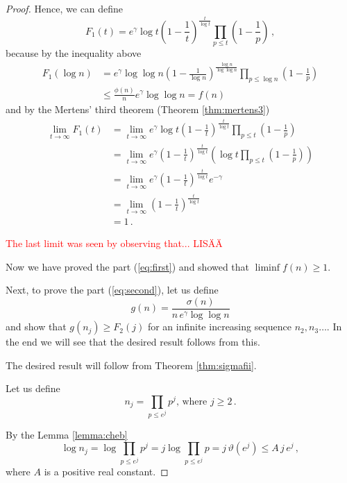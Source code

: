\documentclass{article}
\begin{document}
\begin{theorem}
\begin{proof}
Hence, we can define
\begin{equation*}
    F_1(t)=e^\gamma \log t \left(1-\frac{1}{t}\right)^\frac{t}{\log t} \prod_{p\leq t} \left(1-\frac{1}{p}\right)\,,
\end{equation*}
because by the inequality above
\begin{align*}
    F_1(\log n) & = e^\gamma \log \log n \left(1-\frac{1}{\log n}\right)^\frac{\log n}{\log \log n} \prod_{p\leq \log n} \left(1-\frac{1}{p}\right)\\
    & \leq \frac{\phi(n)}{n} e^\gamma \log\log n = f(n)
\end{align*}
and by the Mertens' third theorem (Theorem \ref{thm:mertens3})
\begin{align*}
    \lim_{t \rightarrow \infty} F_1(t) & = \lim_{t \rightarrow \infty} e^\gamma \log t \left(1-\frac{1}{t}\right)^\frac{t}{\log t} \prod_{p\leq t} \left(1-\frac{1}{p}\right)\\
    & = \lim_{t \rightarrow \infty} e^\gamma \left( 1-\frac{1}{t}\right)^\frac{t}{\log t} \left(\log t \prod_{p\leq t} \left(1-\frac{1}{p}\right) \right)\\
    & = \lim_{t \rightarrow \infty} e^\gamma \left( 1-\frac{1}{t}\right)^\frac{t}{\log t} e^{-\gamma}\\
    & = \lim_{t \rightarrow \infty} \left( 1-\frac{1}{t}\right)^\frac{t}{\log t}\\
    & = 1\,.
\end{align*}

\textcolor{red}{The last limit was seen by observing that... LISÄÄ}

Now we have proved the part (\ref{eq:first}) and showed that
$\liminf{f(n)}\geq 1$.

Next, to prove the part (\ref{eq:second}), let us define
\begin{equation*}
    g(n)=\frac{\sigma(n)}{n\,e^\gamma \log\log n}
\end{equation*}
and show that $g(n_j) \geq F_2(j)$ for an infinite increasing sequence $n_2,n_3\dots$. In the end we will see that the desired result follows from this.

The desired result will follow from Theorem \ref{thm:sigmafii}.

Let us define
\begin{equation*}
    n_j=\prod_{p\leq e^j} p^j\text{, where } j\geq 2\,.
\end{equation*}

By the Lemma \ref{lemma:cheb}
\begin{equation*}
    \log n_j = \log \prod_{p\leq e^j} p^j = j \log \prod_{p\leq e^j} p = j\,\vartheta(e^j) \leq A\,j\,e^j\,,
\end{equation*}
where $A$ is a positive real constant.


\end{proof}
\end{theorem}
\end{document}
